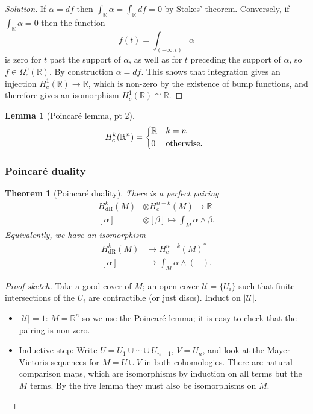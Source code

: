 \documentclass[a4paper]{article}
\newtheorem*{theorem}{Theorem}
\newtheorem*{lemma}{Lemma}
\theoremstyle{definition}
\theoremstyle{remark}
\newcommand{\dR}{\text{dR}}
\newcommand{\U}{\mathcal{U}}
\newcommand{\R}{\mathbb{R}}
\begin{document}
\begin{proof}[Solution]
    If $\alpha=df$ then $\int_\R\alpha=\int_\R df=0$ by Stokes' theorem.
    Conversely, if $\int_\R\alpha=0$ then the function
    \begin{equation*}
        f(t)=\int_{(-\infty,t)}\alpha
    \end{equation*}
    is zero for $t$ past the support of $\alpha$, as well as for $t$ preceding
    the support of $\alpha$, so $f\in\Omega^0_c(\R)$. By construction
    $\alpha=df$. This shows that integration gives an injection
    $H^1_c(\R)\to\R$, which is non-zero by the existence of bump functions, and
    therefore gives an isomorphism $H^1_c(\R)\cong\R$.
\end{proof}

\begin{lemma}[Poincar\'e lemma, pt 2]
    \begin{equation*}
        H^k_c(\R^n) = \begin{dcases*}
            \R & $k=n$ \\
            0 & otherwise.
        \end{dcases*}
    \end{equation*}
\end{lemma}

\subsubsection*{Poincar\'e duality}

\begin{theorem}[Poincar\'e duality]
    There is a perfect pairing
    \begin{align*}
        H^k_\dR(M)&\otimes H^{n-k}_c(M) \to \R \\
        [\alpha]&\otimes[\beta] \mapsto \int_M\alpha\wedge\beta.
    \end{align*}
    Equivalently, we have an isomorphism
    \begin{align*}
        H^k_\dR(M) &\to H^{n-k}_c(M)^* \\
        [\alpha] &\mapsto \int_M\alpha\wedge(-).
    \end{align*}
\end{theorem}

\begin{proof}[Proof sketch]
    Take a good cover of $M$; an open cover $\U=\{U_i\}$ such that
    finite intersections of the $U_i$ are contractible (or just discs). Induct
    on $|\U|$.
    \begin{itemize}
        \item $|\U|=1$: $M=\R^n$ so we use the Poincar\'e lemma; it is easy to
            check that the pairing is non-zero.

        \item Inductive step: Write $U=U_1\cup\cdots\cup U_{n-1}$, $V=U_n$, and
            look at the Mayer-Vietoris sequences for $M=U\cup V$ in both
            cohomologies. There are natural comparison maps, which are
            isomorphisms by induction on all terms but the $M$ terms. By the
            five lemma they must also be isomorphisms on $M$.
    \end{itemize}
\end{proof}
\end{document}
